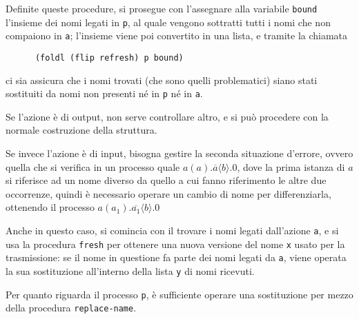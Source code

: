 Definite queste procedure, si prosegue con l'assegnare alla variabile
\lstinline{bound} l'insieme dei nomi legati in \lstinline{p}, al quale
vengono sottratti tutti i nomi che non compaiono in \lstinline{a};
l'insieme viene poi convertito in una lista, e tramite la chiamata

\begin{lstlisting}
      (foldl (flip refresh) p bound)
\end{lstlisting}

ci sia assicura che i nomi trovati (che sono quelli problematici) siano
stati sostituiti da nomi non presenti n\'e in \lstinline{p} n\'e in
\lstinline{a}.

Se l'azione \`e di output, non serve controllare altro, e si pu\`o procedere
con la normale costruzione della struttura.

Se invece l'azione \`e di input, bisogna gestire la seconda situazione
d'errore, ovvero quella che si verifica in un processo quale
$a(a).\overline{a}\langle b\rangle.0$, dove la prima istanza di $a$ si
riferisce ad un nome diverso da quello a cui fanno riferimento le altre due
occorrenze, quindi \`e necessario operare un cambio di nome per
differenziarla, ottenendo il processo
$a(a_1).\overline{a_1}\langle b\rangle.0$

Anche in questo caso, si comincia con il trovare i nomi legati dall'azione
\lstinline{a}, e si usa la procedura \lstinline{fresh} per ottenere una
nuova versione del nome \lstinline{x} usato per la trasmissione: se il
nome in questione fa parte dei nomi legati da \lstinline{a}, viene
operata la sua sostituzione all'interno della lista \lstinline{y} di nomi
ricevuti.

Per quanto riguarda il processo \lstinline{p}, \`e sufficiente operare una
sostituzione per mezzo della procedura \lstinline{replace-name}.
